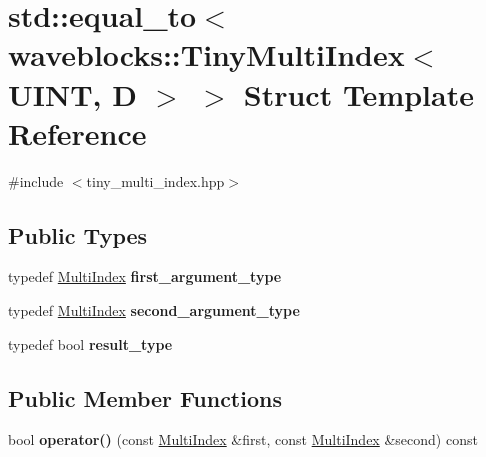 \hypertarget{structstd_1_1equal__to_3_01waveblocks_1_1_tiny_multi_index_3_01_u_i_n_t_00_01_d_01_4_01_4}{}\section{std\+:\+:equal\+\_\+to$<$ waveblocks\+:\+:Tiny\+Multi\+Index$<$ U\+I\+N\+T, D $>$ $>$ Struct Template Reference}
\label{structstd_1_1equal__to_3_01waveblocks_1_1_tiny_multi_index_3_01_u_i_n_t_00_01_d_01_4_01_4}


{\ttfamily \#include $<$tiny\+\_\+multi\+\_\+index.\+hpp$>$}

\subsection*{Public Types}
\begin{DoxyCompactItemize}
\item 
\hypertarget{structstd_1_1equal__to_3_01waveblocks_1_1_tiny_multi_index_3_01_u_i_n_t_00_01_d_01_4_01_4_a09a4eb594dc696b06ad4309a1f6fe963}{}typedef \hyperlink{classwaveblocks_1_1_tiny_multi_index}{Multi\+Index} {\bfseries first\+\_\+argument\+\_\+type}\label{structstd_1_1equal__to_3_01waveblocks_1_1_tiny_multi_index_3_01_u_i_n_t_00_01_d_01_4_01_4_a09a4eb594dc696b06ad4309a1f6fe963}

\item 
\hypertarget{structstd_1_1equal__to_3_01waveblocks_1_1_tiny_multi_index_3_01_u_i_n_t_00_01_d_01_4_01_4_a9118414cd5c1cd6ca52fcfbaf7945cc8}{}typedef \hyperlink{classwaveblocks_1_1_tiny_multi_index}{Multi\+Index} {\bfseries second\+\_\+argument\+\_\+type}\label{structstd_1_1equal__to_3_01waveblocks_1_1_tiny_multi_index_3_01_u_i_n_t_00_01_d_01_4_01_4_a9118414cd5c1cd6ca52fcfbaf7945cc8}

\item 
\hypertarget{structstd_1_1equal__to_3_01waveblocks_1_1_tiny_multi_index_3_01_u_i_n_t_00_01_d_01_4_01_4_a65ab526d6a5449430c0f6aca169b58f9}{}typedef bool {\bfseries result\+\_\+type}\label{structstd_1_1equal__to_3_01waveblocks_1_1_tiny_multi_index_3_01_u_i_n_t_00_01_d_01_4_01_4_a65ab526d6a5449430c0f6aca169b58f9}

\end{DoxyCompactItemize}
\subsection*{Public Member Functions}
\begin{DoxyCompactItemize}
\item 
\hypertarget{structstd_1_1equal__to_3_01waveblocks_1_1_tiny_multi_index_3_01_u_i_n_t_00_01_d_01_4_01_4_a75a16199830e2f494b8b4ba127c011c3}{}bool {\bfseries operator()} (const \hyperlink{classwaveblocks_1_1_tiny_multi_index}{Multi\+Index} \&first, const \hyperlink{classwaveblocks_1_1_tiny_multi_index}{Multi\+Index} \&second) const \label{structstd_1_1equal__to_3_01waveblocks_1_1_tiny_multi_index_3_01_u_i_n_t_00_01_d_01_4_01_4_a75a16199830e2f494b8b4ba127c011c3}

\end{DoxyCompactItemize}


